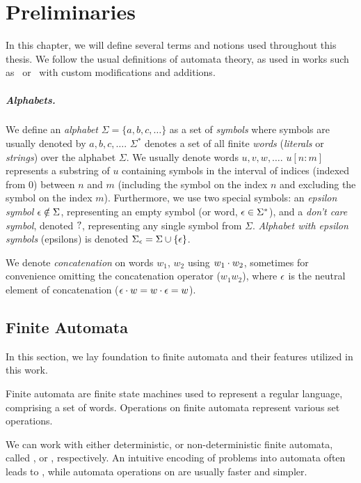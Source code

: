 \chapter{Preliminaries}
\label{sec:Preliminaries}
In this chapter, we will define several terms and notions used throughout this thesis.
We follow the usual definitions of automata theory, as used in works such as~\cite{Esparza} or~\cite{Sipser} with custom modifications and additions.

\paragraph{Alphabets.}
We define an \emph{alphabet} $\Sigma = \{ a, b, c, \ldots \}$ as a set of \emph{symbols} where
symbols are usually denoted by $a, b, c, \ldots$.
$\Sigma^*$ denotes a set of all finite \emph{words} (\emph{literals} or \emph{strings}) over the alphabet $\Sigma$.
We usually denote words $u, v, w, \ldots$.
$u[n:m]$ represents a substring of $u$ containing symbols in the interval of indices (indexed from 0) between $n$ and $m$ (including the symbol on the index $n$ and excluding the symbol on the index $m$).
Furthermore, we use two special symbols: an \emph{epsilon symbol} $\epsilon \notin \Sigma$, representing an empty symbol (or word, $\epsilon \in \Sigma^*$), and a \emph{don't care symbol}, denoted $?$, representing any single symbol from $\Sigma$.
\emph{Alphabet with epsilon symbols} (epsilons) is denoted $\Sigma_\epsilon = \Sigma \cup \{ \epsilon \}$.

We denote \emph{concatenation} on words $w_1$, $w_2$ using $w_1 \cdot w_2$, sometimes for convenience omitting the concatenation operator ($w_1w_2$), where $\epsilon$ is the neutral element of concatenation ($\epsilon \cdot w = w \cdot \epsilon = w$).

\section{Finite Automata}

In this section, we lay foundation to finite automata and their features utilized in this work.

Finite automata are finite state machines used to represent a regular language, comprising a set of words.
Operations on finite automata represent various set operations.

We can work with either deterministic, or non-deterministic finite automata, called \dfa, or \nfa, respectively.
An intuitive encoding of problems into automata often leads to \nfas, while automata operations on \dfas are usually faster and simpler.

